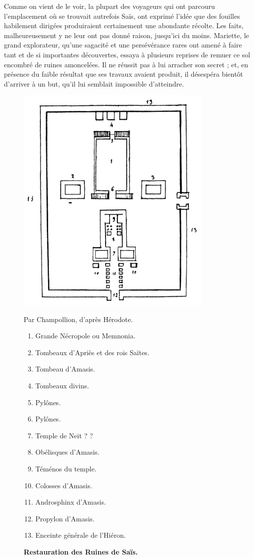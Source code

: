 \documentclass[a4paper, 11pt, oneside]{article}
\begin{document}
Comme on vient de le voir, la plupart des voyageurs qui ont parcouru l'emplacement où se trouvait autrefois Saïs, ont exprimé l'idée que des fouilles habilement dirigées produiraient certainement une abondante récolte. Les faits, malheureusement y ne leur ont pas donné raison, jusqu'ici du moins. Mariette, le grand explorateur, qu'une sagacité et une persévérance rares ont amené à faire tant et de si importantes découvertes, essaya à plusieurs reprises de remuer ce sol encombré de ruines amoncelées. Il ne réussit pas à lui arracher son secret ; et, en présence du faible résultat que ses travaux avaient produit, il désespéra bientôt d'arriver à un but, qu'il lui semblait impossible d'atteindre.
\begin{figure}[H]
\centering
\includegraphics[width=0.85\textwidth,keepaspectratio]{lecultedeneit.png}
\caption{\textbf{Restauration des Ruines de Saïs.}}
Par Champollion, d'après Hérodote.
\footnotesize
\begin{enumerate}
    \item Grande Nécropole ou Memnonia.
    \item Tombeaux d'Apriès et des rois Saïtes.
    \item Tombeau d'Amasis.
    \item Tombeaux divins.
    \item Pylônes.
    \item Pylônes.
    \item Temple de Neit ? ?
    \item Obélisques d'Amasis.
    \item Téménos du temple.
    \item Colosses d'Amasis.
    \item Androsphinx d'Amasis.
    \item Propylon d'Amasis.
    \item Enceinte générale de l'Hiéron.
\end{enumerate}
\end{figure}
\end{document}
